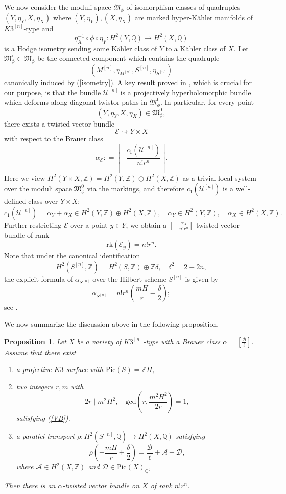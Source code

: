 \documentclass[11pt]{amsart}
\theoremstyle{plain}
\newtheorem{prop}[thm]{Proposition}
\theoremstyle{definition}
\theoremstyle{remark}
\newcommand{\BQ}{{\mathbb{Q}}}
\newcommand{\BZ}{{\mathbb{Z}}}
\newcommand{\CA}{{\mathcal A}}
\newcommand{\CB}{{\mathcal B}}
\newcommand{\CD}{{\mathcal D}}
\newcommand{\CE}{{\mathcal E}}
\newcommand{\CU}{{\mathcal U}}
\newcommand{\FM}{{\mathfrak{M}}}
\begin{document}
We now consider the moduli space $\FM_{\phi}$ of isomorphism classes of quadruples $(Y, \eta_Y, X, \eta_X)$ where $(Y, \eta_Y), (X, \eta_X)$ are marked hyper-K\"ahler manifolds of $K3^{[n]}$-type and 
\[
\eta_X^{-1}\circ \phi \circ \eta_Y: H^2(Y, \BQ) \to H^2(X,\BQ)
\]
is a Hodge isometry sending some K\"ahler class of $Y$ to a K\"ahler class of $X$. Let $\FM^\circ_{\phi} \subset \FM_{\phi}$ be the connected component which contains the quadruple 
\[
(M^{[n]}, \eta_{M^{[n]}}, S^{[n]}, \eta_{S^{[n]}})
\]
canonically induced by (\ref{isometry}). A key result proved in \cite{Markman}, which is crucial for our purpose, is that the bundle $\CU^{[n]}$ is a projectively hyperholomorphic bundle which deforms along diagonal twistor paths in $\FM^0_\phi$. In particular, for every point 
\[
(Y, \eta_Y, X, \eta_X) \in \FM^0_{\phi},
\]
there exists a twisted vector bundle 
\[
\CE \rightsquigarrow Y\times X
\]
with respect to the Brauer class
\[
\alpha_\CE: = \left[- \frac{c_1(\CU^{[n]})}{n!r^n} \right].
\]
Here we view $H^2(Y\times X, \BZ) = H^2(Y, \BZ) \oplus H^2(X, \BZ)$ as a trivial local system over the moduli space $\FM^0_{\phi}$ via the markings, and therefore $c_1(\CU^{[n]})$ is a well-defined class over $Y\times X$:
\[
c_1(\CU^{[n]}) =  \alpha_Y + \alpha_X \in H^2(Y, \BZ) \oplus H^2(X,\BZ), \quad \alpha_Y \in H^2(Y, \BZ),\quad \alpha_X \in H^2(X, \BZ).
\]
Further restricting $\CE$ over a point $y \in Y$, we obtain a $\left[-\frac{\alpha_X}{n!r^n}\right]$-twisted vector bundle of rank
\[
\mathrm{rk}\left( \CE_y \right) = n!r^n.
\]
Note that under the canonical identification
\[
H^2(S^{[n]}, \BZ) = H^2(S, \BZ) \oplus \BZ \delta, \quad \delta^2 = 2-2n,
\]
the explicit formula of $\alpha_{S^{[n]}}$ over the Hilbert scheme $S^{[n]}$ is given by 
\[
\alpha_{S^{[n]}} = n!r^n \left(\frac{mH}{r} - \frac{\delta}{2} \right);
\]
see \cite[Equation (7.11)]{Markman}. 

We now summarize the discussion above in the following proposition.


\begin{prop}\label{prop1.2} Let $X$ be a variety of $K3^{[n]}$-type with a Brauer class $\alpha = \left[ \frac{\CB}{\ell} \right]$. Assume that there exist 
\begin{enumerate}
    \item[(i)] a projective $K3$ surface with $\mathrm{Pic}(S)=\BZ H$,
    \item[(ii)]  two integers $r, m$ with 
    \[
    2r \mid m^2H^2, \quad \mathrm{gcd}\left(r, \frac{m^2H^2}{2r}\right)=1,
    \]
    satisfying (\ref{VB}).
    \item[(iii)] a parallel transport $\rho:  H^2(S^{[n]}, \BQ)  \to H^2(X, \BQ)$ satisfying
\[
\rho \left(- \frac{mH}{r} + \frac{\delta}{2}\right) = \frac{\CB}{\ell} + \CA + \CD,
\]
where $\CA \in H^2(X, \BZ)$ and $\CD\in \mathrm{Pic}(X)_\BQ$,
\end{enumerate}
Then there is an $\alpha$-twisted vector bundle on $X$ of rank $n!r^n$.
\end{prop}
\end{document}
